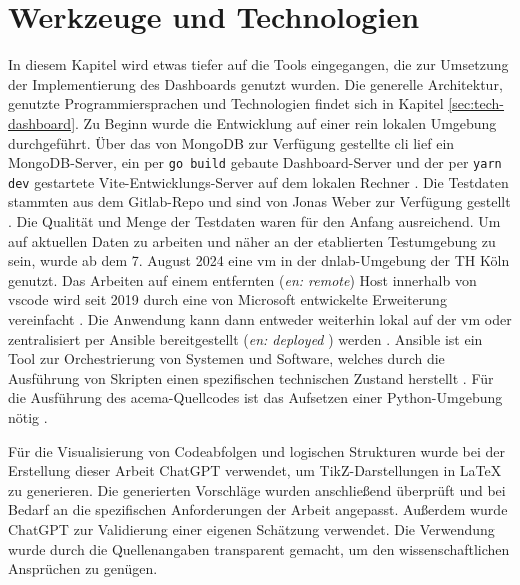 \section{Werkzeuge und Technologien}
\label{sec:Entwicklungsumgebung}
In diesem Kapitel wird etwas tiefer auf die Tools eingegangen, die zur Umsetzung der Implementierung des Dashboards genutzt wurden. Die generelle Architektur, genutzte Programmiersprachen und Technologien findet sich in Kapitel \ref{sec:tech-dashboard}. Zu Beginn wurde die Entwicklung auf einer rein lokalen Umgebung durchgeführt. Über das von MongoDB zur Verfügung gestellte \gls{cli} lief ein MongoDB-Server, ein per \verb|go build| gebaute Dashboard-Server und der per \verb|yarn dev| gestartete Vite-Entwicklungs-Server auf dem lokalen Rechner \autocite{MongoDBDeveloperData,Vite}. Die Testdaten stammten aus dem Gitlab-Repo und sind von Jonas Weber zur Verfügung gestellt \autocite{AddExampleData2023}. Die Qualität und Menge der Testdaten waren für den Anfang ausreichend. Um auf aktuellen Daten zu arbeiten und näher an der etablierten Testumgebung zu sein, wurde ab dem 7. August 2024 eine \gls{vm} in der \glqq\gls{dnlab}\grqq-Umgebung der TH Köln genutzt. Das Arbeiten auf einem entfernten (\textit{en: remote}) Host innerhalb von \gls{vscode} wird seit 2019 durch eine von Microsoft entwickelte Erweiterung vereinfacht \autocite{RemoteSSHVisual}. Die Anwendung kann dann entweder weiterhin lokal auf der \gls{vm} oder zentralisiert per Ansible bereitgestellt (\textit{en: deployed} ) werden \autocite{HomepageAnsibleCollaborative}. Ansible ist ein Tool zur Orchestrierung von Systemen und Software, welches durch die Ausführung von Skripten einen spezifischen technischen Zustand herstellt \autocite{ansiblecollaborativeetalHowAnsibleWorks2024}. Für die Ausführung des \gls{acema}-Quellcodes ist das Aufsetzen einer Python-Umgebung nötig \autocite{klement2023acema,WelcomePythonorg}.
\par Für die Visualisierung von Codeabfolgen und logischen Strukturen wurde bei der Erstellung dieser Arbeit ChatGPT verwendet, um TikZ-Darstellungen in LaTeX zu generieren. Die generierten Vorschläge wurden anschließend überprüft und bei Bedarf an die spezifischen Anforderungen der Arbeit angepasst. Außerdem wurde ChatGPT zur Validierung einer eigenen Schätzung verwendet. Die Verwendung wurde durch die Quellenangaben transparent gemacht, um den wissenschaftlichen Ansprüchen zu genügen.

